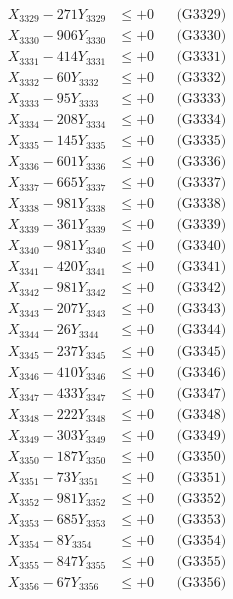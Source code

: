 \documentclass[a4paper,10pt]{article}
\begin{document}
{\begin{align}
X_{3329} - 271Y_{3329} &\leq +0 && \text{(G3329)} \\
X_{3330} - 906Y_{3330} &\leq +0 && \text{(G3330)} \\
\allowbreak
X_{3331} - 414Y_{3331} &\leq +0 && \text{(G3331)} \\
X_{3332} - 60Y_{3332} &\leq +0 && \text{(G3332)} \\
X_{3333} - 95Y_{3333} &\leq +0 && \text{(G3333)} \\
X_{3334} - 208Y_{3334} &\leq +0 && \text{(G3334)} \\
X_{3335} - 145Y_{3335} &\leq +0 && \text{(G3335)} \\
X_{3336} - 601Y_{3336} &\leq +0 && \text{(G3336)} \\
X_{3337} - 665Y_{3337} &\leq +0 && \text{(G3337)} \\
X_{3338} - 981Y_{3338} &\leq +0 && \text{(G3338)} \\
X_{3339} - 361Y_{3339} &\leq +0 && \text{(G3339)} \\
X_{3340} - 981Y_{3340} &\leq +0 && \text{(G3340)} \\
\allowbreak
X_{3341} - 420Y_{3341} &\leq +0 && \text{(G3341)} \\
X_{3342} - 981Y_{3342} &\leq +0 && \text{(G3342)} \\
X_{3343} - 207Y_{3343} &\leq +0 && \text{(G3343)} \\
X_{3344} - 26Y_{3344} &\leq +0 && \text{(G3344)} \\
X_{3345} - 237Y_{3345} &\leq +0 && \text{(G3345)} \\
X_{3346} - 410Y_{3346} &\leq +0 && \text{(G3346)} \\
X_{3347} - 433Y_{3347} &\leq +0 && \text{(G3347)} \\
X_{3348} - 222Y_{3348} &\leq +0 && \text{(G3348)} \\
X_{3349} - 303Y_{3349} &\leq +0 && \text{(G3349)} \\
X_{3350} - 187Y_{3350} &\leq +0 && \text{(G3350)} \\
\allowbreak
X_{3351} - 73Y_{3351} &\leq +0 && \text{(G3351)} \\
X_{3352} - 981Y_{3352} &\leq +0 && \text{(G3352)} \\
X_{3353} - 685Y_{3353} &\leq +0 && \text{(G3353)} \\
X_{3354} - 8Y_{3354} &\leq +0 && \text{(G3354)} \\
X_{3355} - 847Y_{3355} &\leq +0 && \text{(G3355)} \\
X_{3356} - 67Y_{3356} &\leq +0 && \text{(G3356)} \\

\end{align}}
\end{document}

